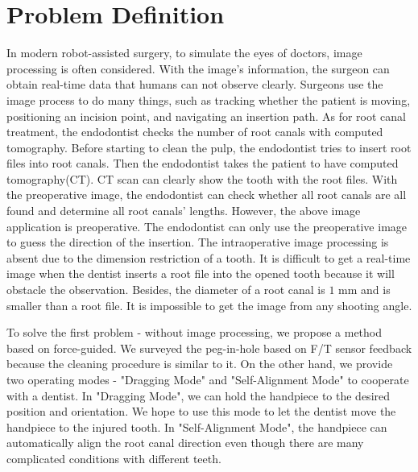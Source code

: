 \section{Problem Definition}
\label{sec:pro def}
\hspace*{6mm}In modern robot-assisted surgery, to simulate the eyes of doctors,  image processing is often considered. With the image's information, the surgeon can obtain real-time data that humans can not observe clearly. Surgeons use the image process to do many things, such as tracking whether the patient is moving, positioning an incision point, and navigating an insertion path. As for root canal treatment, the endodontist checks the number of root canals with computed tomography.  Before starting to clean the pulp, the endodontist tries to insert root files into root canals. Then the endodontist takes the patient to have computed tomography(CT). CT scan can clearly show the tooth with the root files. With the preoperative image, the endodontist can check whether all root canals are all found and determine all root canals' lengths. However, the above image application is preoperative. The endodontist can only use the preoperative image to guess the direction of the insertion. The intraoperative image processing is absent due to the dimension restriction of a tooth. It is difficult to get a real-time image when the dentist inserts a root file into the opened tooth because it will obstacle the observation. Besides, the diameter of a root canal is $1$ mm and is smaller than a root file. It is impossible to get the image from any shooting angle.
\par
To solve the first problem - without image processing, we propose a method based on force-guided. We surveyed the peg-in-hole based on F/T sensor feedback \cite{7743375} because the cleaning procedure is similar to it. On the other hand, we provide two operating modes - "Dragging Mode" and "Self-Alignment Mode" to cooperate with a dentist. In "Dragging Mode", we can hold the handpiece to the desired position and orientation. We hope to use this mode to let the dentist move the handpiece to the injured tooth. In "Self-Alignment Mode", the handpiece can automatically align the root canal direction even though there are many complicated conditions with different teeth.

